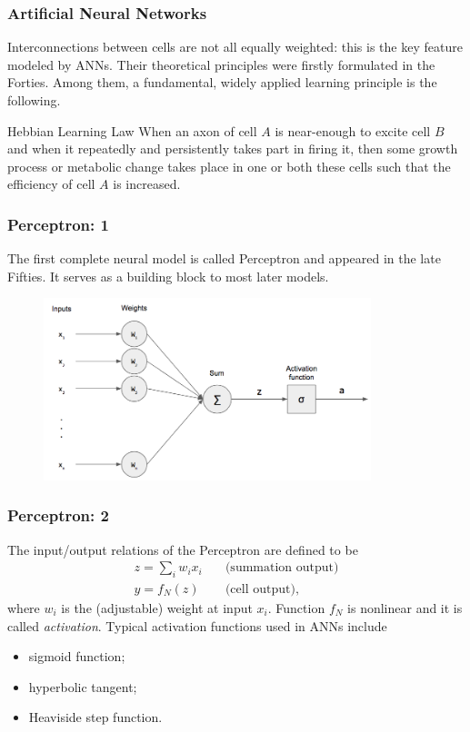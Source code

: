 \documentclass{beamer}
\begin{document}

\begin{frame}
\frametitle{Artificial Neural Networks}
Interconnections between cells are not all equally weighted: this is the key feature modeled by ANNs. Their theoretical principles were firstly formulated in the Forties. Among them, a fundamental, widely applied learning principle is the following.
\begin{block}{Hebbian Learning Law}
When an axon of cell $A$ is near-enough to excite cell $B$ and when it repeatedly and persistently takes part in firing it, then some growth process
or metabolic change takes place in one or both these cells such that the efficiency of cell $A$ is increased.
\end{block}
\end{frame}


\begin{frame}
\frametitle{Perceptron: 1}
The first complete neural model is called Perceptron and appeared in the late Fifties. It serves as a building block to most later models.
\begin{figure}
\centering
\includegraphics[width = 0.85\textwidth]{"pictures/perceptron.png"}
\end{figure}
\end{frame}

\begin{frame}
\frametitle{Perceptron: 2}
The input/output relations of the Perceptron are defined to be
\begin{align*}
z = \sum_{i}w_i x_i \quad &\text{(summation output)} \\
y = f_N(z) \quad &\text{(cell output)}, 
\end{align*}
where $w_i$ is the (adjustable) weight at input $x_i$. Function $f_N$ is nonlinear and it is called \emph{activation}. Typical activation functions used in ANNs include
\begin{itemize}
\item sigmoid function;
\item hyperbolic tangent;
\item Heaviside step function.
\end{itemize}
\end{frame}
\end{document}
